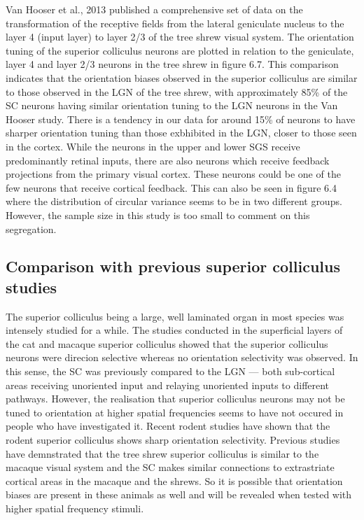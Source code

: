 \documentclass [12pt]{report}
\begin{document}
	Van Hooser et al., 2013 published a comprehensive set of data on the transformation of the receptive fields from the lateral geniculate nucleus to the layer 4 (input layer) to layer 2/3 of the tree shrew visual system. The orientation tuning of the superior colliculus neurons are plotted in relation to the geniculate, layer 4 and layer 2/3 neurons in the tree shrew in figure 6.7. This comparison indicates that the orientation biases observed in the superior colliculus are similar to those observed in the LGN of the tree shrew, with approximately 85\% of the SC neurons having similar orientation tuning to the LGN neurons in the Van Hooser study. There is a tendency in our data for around 15\% of neurons to have sharper orientation tuning than those exbhibited in the LGN, closer to those seen in the cortex. While the neurons in the upper and lower SGS receive predominantly retinal inputs, there are also neurons which receive feedback projections from the primary visual cortex. These neurons could be one of the few neurons that receive cortical feedback. This can also be seen in figure 6.4 where the distribution of circular variance seems to be in two different groups. However, the sample size in this study is too small to comment on this segregation.
	
	\subsection{Comparison with previous superior colliculus studies}
	
	The superior colliculus being a large, well laminated organ in most species was intensely studied for a while. The studies conducted in the superficial layers of the cat and macaque superior colliculus showed that the superior colliculus neurons were direcion selective whereas no orientation selectivity was observed. In this sense, the SC was previously compared to the LGN — both sub-cortical areas receiving unoriented input and relaying unoriented inputs to different pathways. However, the realisation that superior colliculus neurons may not be tuned to orientation at higher spatial frequencies seems to have not occured in people who have investigated it. Recent rodent studies have shown that the rodent superior colliculus shows sharp orientation selectivity. Previous studies have demnstrated that the tree shrew superior colliculus is similar to the macaque visual system and the SC makes similar connections to extrastriate cortical areas in the macaque and the shrews. So it is possible that orientation biases are present in these animals as well and will be revealed when tested with higher spatial frequency stimuli.
	
\end{document}

